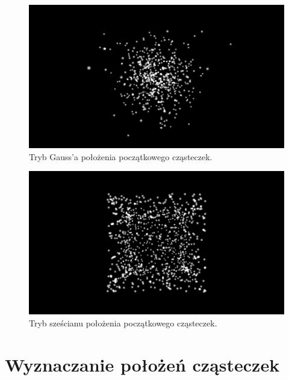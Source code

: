 \documentclass[12pt, twoside, openany]{report}
\begin{document}
\begin{figure}[H]
\centering
\includegraphics[width=\textwidth]{gauss.png}
\caption{Tryb Gauss’a położenia początkowego cząsteczek.}
\label{fig:tryb_gauss}
\end{figure}

\begin{figure}[H]
\centering
\includegraphics[width=\textwidth]{cube.png}
\caption{Tryb sześcianu położenia początkowego cząsteczek.}
\label{fig:tryb_cube}
\end{figure}

\section{Wyznaczanie położeń cząsteczek}
\end{document}
